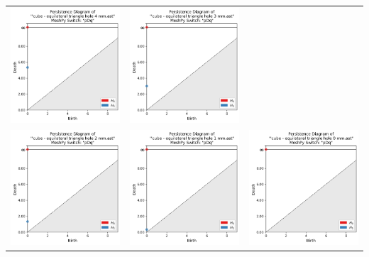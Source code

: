 \documentclass[ma]{uncgdissertationexp}
\theoremstyle{plain}
\theoremstyle{definition}
\theoremstyle{remark}
\begin{document}
\begin{table}[H]
\begin{center}
\begin{tabular}{ccc}
         \includegraphics[width=1.875in]{Final Run, (cube - equilateral triangle hole 4 mm) persdia.png} & 
         \includegraphics[width=1.875in]{Final Run, (cube - equilateral triangle hole 3 mm) persdia.png} \\
         \includegraphics[width=1.875in]{Final Run, (cube - equilateral triangle hole 2 mm) persdia.png} & 
         \includegraphics[width=1.875in]{Final Run, (cube - equilateral triangle hole 1 mm) persdia.png} & 
         \includegraphics[width=1.875in]{Final Run, (cube - equilateral triangle hole 0 mm) persdia.png} \\

\end{tabular}
\end{center}
\end{table}
\end{document}
